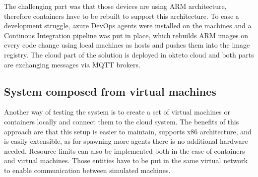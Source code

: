 The challenging part was that those devices are using ARM architecture, therefore containers have to be rebuilt to support this architecture. To ease a development struggle, azure DevOps agents were installed on the machines and a Continous Integration pipeline was put in place, which rebuilds ARM images on every code change using local machines as hosts and pushes them into the image registry. The cloud part of the solution is deployed in okteto cloud and both parts are exchanging messages via MQTT brokers.

\subsection{System composed from virtual machines}
Another way of testing the system is to create a set of virtual machines or containers locally and connect them to the cloud system. The benefits of this approach are that this setup is easier to maintain, supports x86 architecture, and is easily extensible, as for spawning more agents there is no additional hardware needed. Resource limits can also be implemented both in the case of containers and virtual machines. Those entities have to be put in the same virtual network to enable communication between simulated machines.